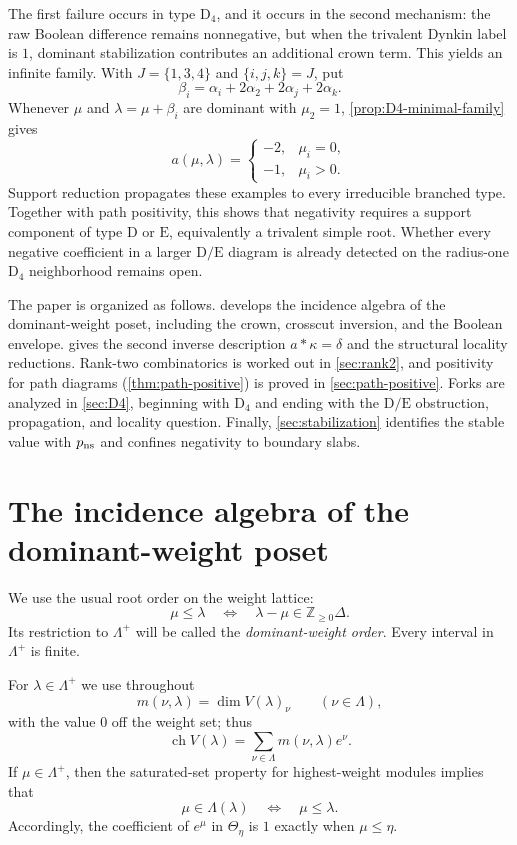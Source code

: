 \documentclass[11pt]{article}
\theoremstyle{definition}
\theoremstyle{remark}
\newcommand{\RaizSimp}{\Delta}
\newcommand{\Pesos}{\Lambda}
\newcommand{\chr}{\operatorname{ch}}
\newcommand{\typeD}{\ensuremath{\mathrm{D}}}
\newcommand{\typeE}{\ensuremath{\mathrm{E}}}
\newcommand{\Z}{\mathbb Z}
\begin{document}
The first failure occurs in type $\typeD_4$, and it occurs in the second
mechanism: the raw Boolean difference remains nonnegative, but when the
trivalent Dynkin label is $1$, dominant stabilization contributes an additional
crown term.  This yields an infinite family.  With $J=\{1,3,4\}$ and
$\{i,j,k\}=J$, put
\[
 \beta_i=\alpha_i+2\alpha_2+2\alpha_j+2\alpha_k.
\]
Whenever $\mu$ and $\lambda=\mu+\beta_i$ are dominant with $\mu_2=1$,
\cref{prop:D4-minimal-family} gives
\[
 a(\mu,\lambda)=
 \begin{cases}
 -2,&\mu_i=0,\\
 -1,&\mu_i>0.
 \end{cases}
\]
Support reduction propagates these examples to every irreducible branched
type.  Together with path positivity, this shows that negativity requires a
support component of type $\typeD$ or $\typeE$, equivalently a trivalent
simple root.  Whether every negative coefficient in a larger $\typeD/\typeE$
diagram is already detected on the radius-one $\typeD_4$ neighborhood remains
open.

The paper is organized as follows.   develops the incidence
algebra of the dominant-weight poset, including the crown, crosscut inversion,
and the Boolean envelope.   gives the second inverse
description $a*\kappa=\delta$ and the structural locality reductions.
Rank-two combinatorics is worked out in \cref{sec:rank2}, and positivity for
path diagrams (\cref{thm:path-positive}) is proved in \cref{sec:path-positive}.  Forks are analyzed in \cref{sec:D4},
beginning with $\typeD_4$ and ending with the $\typeD/\typeE$ obstruction,
propagation, and
locality question.  Finally, \cref{sec:stabilization} identifies the stable
value with $p_{\rm ns}$ and confines negativity to boundary slabs.

\section{The incidence algebra of the dominant-weight poset}\label{sec:atomic}\label{sec:dominant-poset}

We use the usual root order on the weight lattice:
\[
   \mu\le \lambda
   \quad\Longleftrightarrow\quad
   \lambda-\mu\in \Z_{\ge0}\RaizSimp.
\]
Its restriction to $\Pesos^+$ will be called the \emph{dominant-weight order}.
Every interval in $\Pesos^+$ is finite.

For $\lambda\in\Pesos^+$ we use throughout
\[
    m(\nu,\lambda)=\dim V(\lambda)_\nu
    \qquad(\nu\in\Pesos),
\]
with the value $0$ off the weight set; thus
\[
    \chr V(\lambda)
      =\sum_{\nu\in\Pesos}m(\nu,\lambda)e^\nu.
\]
If $\mu\in\Pesos^+$, then the saturated-set property for highest-weight
modules implies that
\[
   \mu\in\Pesos(\lambda)
   \quad\Longleftrightarrow\quad
   \mu\le\lambda.
\]
Accordingly, the coefficient of $e^\mu$ in $\Theta_\eta$ is $1$ exactly when
$\mu\le\eta$.
\end{document}
